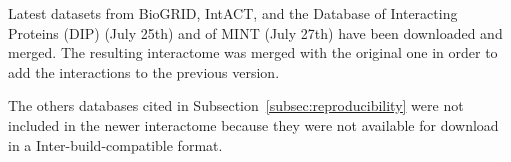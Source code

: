 \documentclass[letterpaper]{article}
\begin{document}
	Latest datasets from BioGRID, IntACT, and the Database of Interacting Proteins (DIP) \citep{salwinski2004DIP}
	(July 25th) and of MINT (July 27th) have been downloaded and merged. The resulting interactome was merged with
	the original one in order to add the interactions to the previous version.

	The others databases cited in Subsection~\ref{subsec:reproducibility} were not included in the newer
	interactome because they were not available for download in a Inter-build-compatible format.

\footnotesize

{}
\end{document}
